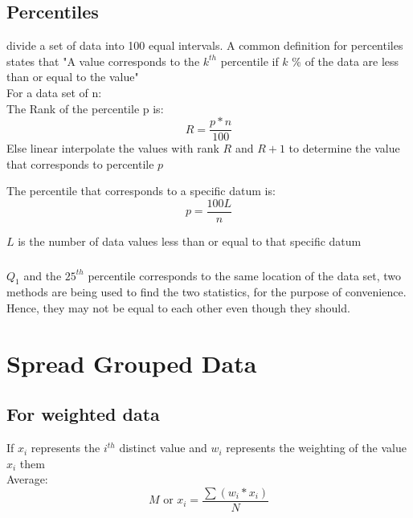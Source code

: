 \subsection{Percentiles}
 divide a set of data into 100 equal intervals. A common definition for percentiles states that 
"A value corresponds to the $k^{th}$ percentile if $k$ \% of the data are less than or equal to the value"\\

For a data set of n:\\

The Rank of the percentile p is:
\begin{equation*}
    R = \frac{p*n}{100}
\end{equation*}
Else linear interpolate the values with rank $R$ and $R + 1$ to determine the value that corresponds to percentile $p$

The percentile that corresponds to a specific datum is:
\begin{equation*}
    p = \frac{100L}{n}
\end{equation*}
\begin{center}
    $L$ is the number of data values less than or equal to that specific datum
\end{center}

\subsubsection{}
$Q_1$ and the $25^{th}$ percentile corresponds to the same location of the data set, two 
methods are being used to find the two statistics, for the purpose of convenience. Hence, they may not 
be equal to each other even though they should.

\section{Spread Grouped Data}
\subsection{For weighted data}
If $x_i$ represents the $i^{th}$ distinct value and $w_i$ represents the weighting of the value $x_i$ them\\

Average:
\begin{equation}
    M \text{ or } x_i = \frac{\sum (w_i * x_i)}{N}
\end{equation}

